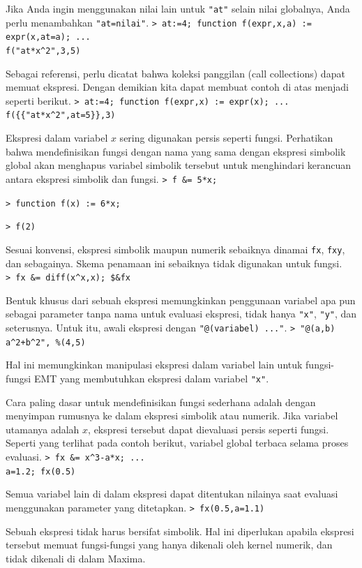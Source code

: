 \documentclass[11pt, a4paper]{article}
\newcommand{\emtcmd}[1]{\noindent\texttt{\textcolor{emtcommand}{>}\ #1}\par\smallskip}
\begin{document}
Jika Anda ingin menggunakan nilai lain untuk \texttt{"at"} selain nilai globalnya, Anda perlu menambahkan \texttt{"at=nilai"}.
\emtcmd{at:=4; function f(expr,x,a) := expr(x,at=a); ... \\
\hspace*{1em} f("at*x\^{}2",3,5)}

Sebagai referensi, perlu dicatat bahwa koleksi panggilan (call collections) dapat memuat ekspresi. Dengan demikian kita dapat membuat contoh di atas menjadi seperti berikut.
\emtcmd{at:=4; function f(expr,x) := expr(x); ... \\
\hspace*{1em} f(\{\{"at*x\^{}2",at=5\}\},3)}

Ekspresi dalam variabel $x$ sering digunakan persis seperti fungsi. Perhatikan bahwa mendefinisikan fungsi dengan nama yang sama dengan ekspresi simbolik global akan menghapus variabel simbolik tersebut untuk menghindari kerancuan antara ekspresi simbolik dan fungsi.
\emtcmd{f \&= 5*x;}
\emtcmd{function f(x) := 6*x;}
\emtcmd{f(2)}

Sesuai konvensi, ekspresi simbolik maupun numerik sebaiknya dinamai \texttt{fx}, \texttt{fxy}, dan sebagainya. Skema penamaan ini sebaiknya tidak digunakan untuk fungsi.
\emtcmd{fx \&= diff(x\^{}x,x); \$\&fx}

Bentuk khusus dari sebuah ekspresi memungkinkan penggunaan variabel apa pun sebagai parameter tanpa nama untuk evaluasi ekspresi, tidak hanya \texttt{"x"}, \texttt{"y"}, dan seterusnya. Untuk itu, awali ekspresi dengan \texttt{"@(variabel) ..."}.
\emtcmd{"@(a,b) a\^{}2+b\^{}2", \%(4,5)}

Hal ini memungkinkan manipulasi ekspresi dalam variabel lain untuk fungsi-fungsi EMT yang membutuhkan ekspresi dalam variabel \texttt{"x"}.

Cara paling dasar untuk mendefinisikan fungsi sederhana adalah dengan menyimpan rumusnya ke dalam ekspresi simbolik atau numerik. Jika variabel utamanya adalah $x$, ekspresi tersebut dapat dievaluasi persis seperti fungsi. Seperti yang terlihat pada contoh berikut, variabel global terbaca selama proses evaluasi.
\emtcmd{fx \&= x\^{}3-a*x; ... \\
\hspace*{1em} a=1.2; fx(0.5)}

Semua variabel lain di dalam ekspresi dapat ditentukan nilainya saat evaluasi menggunakan parameter yang ditetapkan.
\emtcmd{fx(0.5,a=1.1)}

Sebuah ekspresi tidak harus bersifat simbolik. Hal ini diperlukan apabila ekspresi tersebut memuat fungsi-fungsi yang hanya dikenali oleh kernel numerik, dan tidak dikenali di dalam Maxima.
\end{document}
